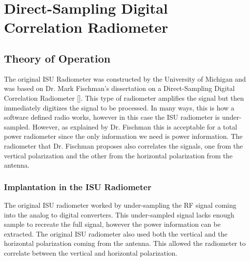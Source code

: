 \chapter{Direct-Sampling Digital Correlation Radiometer}

\section*{Theory of Operation}

The original ISU Radiometer was constructed by the University of Michigan and was based on Dr. Mark Fischman's dissertation on a Direct-Sampling Digital Correlation Radiometer [\cite{Fischman2001}].  This type of radiometer amplifies the signal but then immediately digitizes the signal to be processed.  In many ways, this is how a software defined radio works, however in this case the ISU radiometer is under-sampled.  However, as explained by Dr. Fischman this is acceptable for a total power radiometer since the only information we need is power information.  The radiometer that Dr. Fischman proposes also correlates the signals, one from the vertical polarization and the other from the horizontal polarization from the antenna.  

\subsection{Implantation in the ISU Radiometer}
The original ISU radiometer worked by under-sampling the RF signal coming into the analog to digital converters.  This under-sampled signal lacks enough sample to recreate the full signal, however the power information can be extracted.  The original ISU radiometer also used both the vertical and the horizontal polarization coming from the antenna. This allowed the radiometer to correlate between the vertical and horizontal polarization.  
